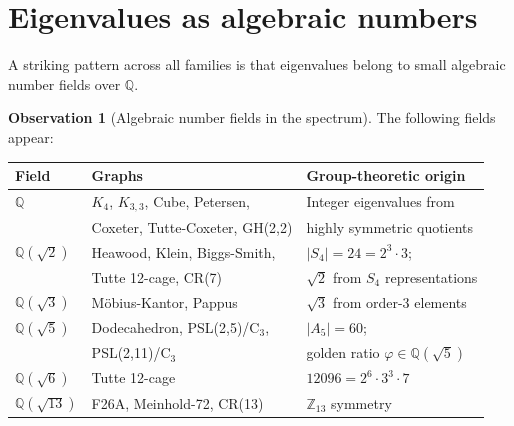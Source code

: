 \documentclass[11pt,a4paper]{article}
\theoremstyle{plain}
\theoremstyle{definition}
\newtheorem{observation}[theorem]{Observation}
\theoremstyle{remark}
\newcommand{\Z}{\mathbb{Z}}
\newcommand{\Q}{\mathbb{Q}}
\begin{document}
\section{Eigenvalues as algebraic numbers}

A striking pattern across all families is that eigenvalues belong to small
algebraic number fields over $\Q$.

\begin{tcolorbox}[breakable, colback=black!5, colframe=black!5,
  boxrule=0pt, sharp corners]
\begin{observation}[Algebraic number fields in the spectrum]
\label{obs:fields}
The following fields appear:
\begin{center}
\small
\begin{tabular}{@{}l l l@{}}
\toprule
Field & Graphs & Group-theoretic origin \\
\midrule
$\Q$ & $K_4$, $K_{3,3}$, Cube, Petersen, & Integer eigenvalues from \\
              & Coxeter, Tutte-Coxeter, GH(2,2) & highly symmetric quotients \\
$\Q(\sqrt{2})$ & Heawood, Klein, Biggs-Smith, & $|S_4| = 24 = 2^3 \cdot 3$; \\
              & Tutte 12-cage, CR(7) & $\sqrt{2}$ from $S_4$ representations \\
$\Q(\sqrt{3})$ & M\"obius-Kantor, Pappus & $\sqrt{3}$ from order-3 elements \\
$\Q(\sqrt{5})$ & Dodecahedron, PSL(2,5)/C$_3$, & $|A_5| = 60$; \\
              & PSL(2,11)/C$_3$ & golden ratio $\varphi \in \Q(\sqrt{5})$ \\
$\Q(\sqrt{6})$ & Tutte 12-cage & $12096 = 2^6 \cdot 3^3 \cdot 7$ \\
$\Q(\sqrt{13})$ & F26A, Meinhold-72, CR(13) & $\Z_{13}$ symmetry \\
\bottomrule
\end{tabular}
\end{center}
\end{observation}
\end{tcolorbox}
\end{document}
